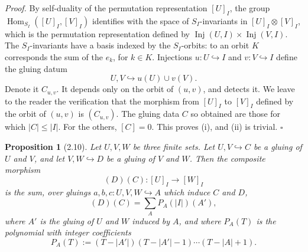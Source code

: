 \documentclass[11pt]{article}
\newcommand{\Hom}{\operatorname{Hom}}
\newcommand{\Inj}{\operatorname{Inj}}
\theoremstyle{deligne}
\newtheorem*{proposition*}{Proposition}
\newenvironment{proofdel}{\textit{Proof.}}{\hfill$\square$}
\begin{document}
\begin{proofdel}
By self-duality of the permutation representation \([U]_I\), the group \(\Hom_{S_I}([U]_I,[V]_I)\) identifies with the space of \(S_I\)-invariants in \([U]_I\otimes[V]_I\), which is the permutation representation defined by \(\Inj(U,I)\times\Inj(V,I)\). The \(S_I\)-invariants have a basis indexed by the \(S_I\)-orbits: to an orbit \(K\) corresponds the sum of the \(e_k\), for \(k\in K\). Injections \(u:U\hookrightarrow I\) and \(v:V\hookrightarrow I\) define the gluing datum
\[
  U,V\hookrightarrow u(U)\cup v(V).
\]
Denote it \(C_{u,v}\). It depends only on the orbit of \((u,v)\), and detects it. We leave to the reader the verification that the morphism from \([U]_I\) to \([V]_I\) defined by the orbit of \((u,v)\) is \((C_{u,v})\). The gluing data \(C\) so obtained are those for which \(|C|\le |I|\). For the others, \([C]=0\). This proves (i), and (ii) is trivial.
\end{proofdel}

\begin{proposition*}[2.10]
Let \(U,V,W\) be three finite sets. Let \(U,V\hookrightarrow C\) be a gluing of \(U\) and \(V\), and let \(V,W\hookrightarrow D\) be a gluing of \(V\) and \(W\). Then the composite morphism
\[
  (D)(C):[U]_I\longrightarrow[W]_I
\]
is the sum, over gluings \(a,b,c:U,V,W\hookrightarrow A\) which induce \(C\) and \(D\),
\[
  (D)(C)=\sum_A P_A(|I|)(A'),
  \tag{2.10.1}
\]
where \(A'\) is the gluing of \(U\) and \(W\) induced by \(A\), and where \(P_A(T)\) is the polynomial with integer coefficients
\[
  P_A(T):=(T-|A'|)(T-|A'|-1)\cdots(T-|A|+1).
  \tag{2.10.2}
\]
\end{proposition*}
\end{document}
